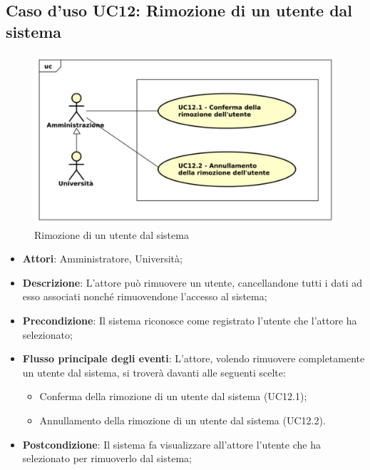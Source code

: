 \subsection{Caso d'uso \texorpdfstring{UC12}{UC12}: Rimozione di un utente dal sistema}
\begin{figure} [H]
	\centering
	\includegraphics[scale=0.45]{./img/UC12.pdf}
	\caption{Rimozione di un utente dal sistema}\label{}
\end{figure}
\begin{itemize}
	\item \textbf{Attori}: Amministratore, Università;
	\item \textbf{Descrizione}: L'attore può rimuovere un utente, cancellandone tutti i dati ad esso associati nonché rimuovendone l'accesso al sistema;
	\item \textbf{Precondizione}: Il sistema riconosce come registrato l'utente che l'attore ha selezionato;
	\item \textbf{Flusso principale degli eventi}: L'attore, volendo rimuovere completamente un utente dal sistema, si troverà davanti alle seguenti scelte:
	\begin{itemize}
		\item Conferma della rimozione di un utente dal sistema (UC12.1);
		\item Annullamento della rimozione di un utente dal sistema (UC12.2).
	\end{itemize}
	\item \textbf{Postcondizione}: Il sistema fa visualizzare all'attore l'utente che ha selezionato per rimuoverlo dal sistema;
\end{itemize}
